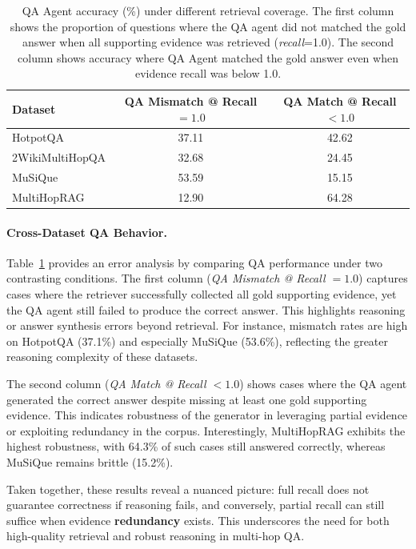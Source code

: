\documentclass{article} %
\begin{document}

\begin{table}[ht]
\centering
\small
\caption{QA Agent accuracy (\%) under different retrieval coverage.
The first column shows the proportion of questions where the QA agent
did not matched the gold answer when all supporting evidence was retrieved
(\textit{recall}=1.0). The second column shows accuracy where QA Agent matched the gold answer even when evidence recall
was below 1.0.}
\begin{tabular}{l|c|c}
\toprule
\textbf{Dataset} & \textbf{QA Mismatch @ Recall $=1.0$} & \textbf{QA Match @ Recall $<1.0$} \\
\midrule
HotpotQA         & 37.11 & 42.62 \\
\midrule
2WikiMultiHopQA  & 32.68 & 24.45 \\
\midrule
MuSiQue          & 53.59 & 15.15 \\
\midrule
MultiHopRAG      & 12.90 & 64.28 \\
\bottomrule
\end{tabular}
\label{tab:qa-vs-recall-all}
\end{table}



\paragraph{Cross-Dataset QA Behavior.}
Table~\ref{tab:qa-vs-recall-all} provides an error analysis by comparing QA
performance under two contrasting conditions. The first column (\textit{QA
Mismatch @ Recall $=1.0$}) captures cases where the retriever successfully
collected all gold supporting evidence, yet the QA agent still failed to
produce the correct answer. This highlights reasoning or answer synthesis
errors beyond retrieval. For instance, mismatch rates are high on HotpotQA
(37.1\%) and especially MuSiQue (53.6\%), reflecting the greater reasoning
complexity of these datasets.  

The second column (\textit{QA Match @ Recall $<1.0$}) shows cases where the
QA agent generated the correct answer despite missing at least one gold
supporting evidence. This indicates robustness of the generator in leveraging
partial evidence or exploiting redundancy in the corpus. Interestingly,
MultiHopRAG exhibits the highest robustness, with 64.3\% of such cases still
answered correctly, whereas MuSiQue remains brittle (15.2\%).  

Taken together, these results reveal a nuanced picture: full recall does not
guarantee correctness if reasoning fails, and conversely, partial recall can
still suffice when evidence \textbf{redundancy} exists. This underscores the need for
both high-quality retrieval and robust reasoning in multi-hop QA.
\end{document}
